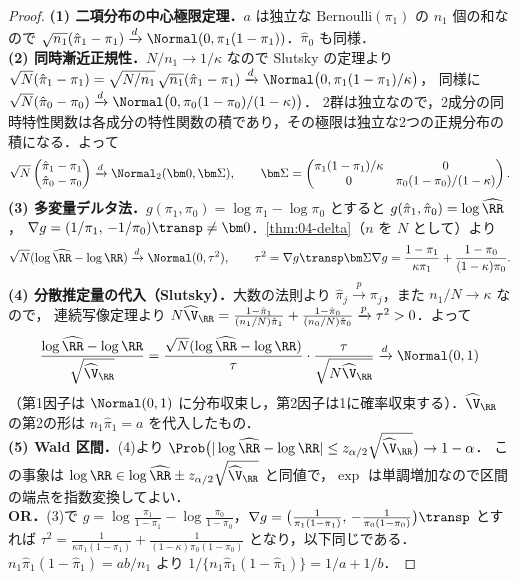 \begin{proof}
\textbf{(1) 二項分布の中心極限定理．}$a$ は独立な $\mathrm{Bernoulli}(\pi_1)$ の $n_1$ 個の和なので
$\sqrt{n_1}(\hat\pi_1-\pi_1)\xrightarrow{d}\Normal(0,\pi_1(1-\pi_1))$．$\hat\pi_0$ も同様．\\
\textbf{(2) 同時漸近正規性．}$N/n_1\to1/\kappa$ なので Slutsky の定理より
$\sqrt N(\hat\pi_1-\pi_1)=\sqrt{N/n_1}\,\sqrt{n_1}(\hat\pi_1-\pi_1)\xrightarrow{d}\Normal\bigl(0,\pi_1(1-\pi_1)/\kappa\bigr)$，
同様に $\sqrt N(\hat\pi_0-\pi_0)\xrightarrow{d}\Normal\bigl(0,\pi_0(1-\pi_0)/(1-\kappa)\bigr)$．
2群は独立なので，2成分の同時特性関数は各成分の特性関数の積であり，その極限は独立な2つの正規分布の積になる．よって
\[
\sqrt N\begin{pmatrix}\hat\pi_1-\pi_1\\ \hat\pi_0-\pi_0\end{pmatrix}\xrightarrow{d}\Normal_2(\bm0,\bm\Sigma),\qquad
\bm\Sigma=\begin{pmatrix}\pi_1(1-\pi_1)/\kappa&0\\0&\pi_0(1-\pi_0)/(1-\kappa)\end{pmatrix}.
\]
\textbf{(3) 多変量デルタ法．}$g(\pi_1,\pi_0)=\log\pi_1-\log\pi_0$ とすると $g(\hat\pi_1,\hat\pi_0)=\log\widehat{\RR}$，
$\nabla g=(1/\pi_1,\,-1/\pi_0)\transp\ne\bm0$．\cref{thm:04-delta}（$n$ を $N$ として）より
\[
\sqrt N(\log\widehat{\RR}-\log\RR)\xrightarrow{d}\Normal(0,\tau^2),\qquad
\tau^2=\nabla g\transp\bm\Sigma\nabla g=\frac{1-\pi_1}{\kappa\pi_1}+\frac{1-\pi_0}{(1-\kappa)\pi_0}.
\]
\textbf{(4) 分散推定量の代入（Slutsky）．}大数の法則より $\hat\pi_j\xrightarrow{p}\pi_j$，また $n_1/N\to\kappa$ なので，
連続写像定理より $N\widehat\V_{\RR}=\frac{1-\hat\pi_1}{(n_1/N)\hat\pi_1}+\frac{1-\hat\pi_0}{(n_0/N)\hat\pi_0}\xrightarrow{p}\tau^2>0$．よって
\[
\frac{\log\widehat{\RR}-\log\RR}{\sqrt{\widehat\V_{\RR}}}
=\frac{\sqrt N(\log\widehat{\RR}-\log\RR)}{\tau}\cdot\frac{\tau}{\sqrt{N\widehat\V_{\RR}}}\xrightarrow{d}\Normal(0,1)
\]
（第1因子は $\Normal(0,1)$ に分布収束し，第2因子は1に確率収束する）．$\widehat\V_{\RR}$ の第2の形は $n_1\hat\pi_1=a$ を代入したもの．\\
\textbf{(5) Wald 区間．}(4)より $\Prob\bigl(|\log\widehat{\RR}-\log\RR|\le z_{\alpha/2}\sqrt{\widehat\V_{\RR}}\bigr)\to1-\alpha$．
この事象は $\log\RR\in\log\widehat{\RR}\pm z_{\alpha/2}\sqrt{\widehat\V_{\RR}}$ と同値で，$\exp$ は単調増加なので区間の端点を指数変換してよい．\\
\textbf{OR．}(3)で $g=\log\frac{\pi_1}{1-\pi_1}-\log\frac{\pi_0}{1-\pi_0}$，$\nabla g=\bigl(\frac1{\pi_1(1-\pi_1)},\,-\frac1{\pi_0(1-\pi_0)}\bigr)\transp$ とすれば
$\tau^2=\frac1{\kappa\pi_1(1-\pi_1)}+\frac1{(1-\kappa)\pi_0(1-\pi_0)}$ となり，以下同じである．
$n_1\hat\pi_1(1-\hat\pi_1)=ab/n_1$ より $1/\{n_1\hat\pi_1(1-\hat\pi_1)\}=1/a+1/b$．
\end{proof}
